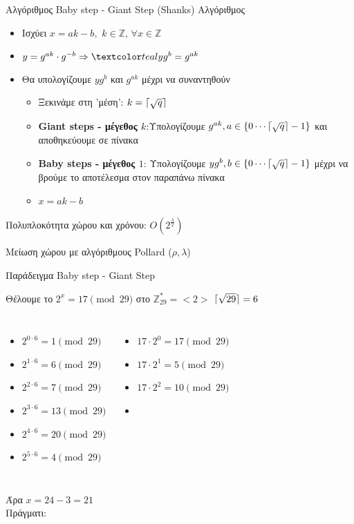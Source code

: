 \documentclass[handout]{beamer}
\DeclarePairedDelimiter{\ceil}{\lceil}{\rceil}
\begin{document}
\begin{frame}{Αλγόριθμος Baby step - Giant Step (Shanks)}
Αλγόριθμος 
\begin{itemize}
\item Ισχύει $x = ak-b, \, \,  k \in \mathbb{Z}, \, \forall x \in \mathbb{Z}$ 
\pause
\item $y=g^{ak} \cdot g^{-b} \Rightarrow \green{{y}{g^b}=g^{ak}}$
\pause
\item Θα υπολογίζουμε $yg^b$ και $g^{ak}$ μέχρι να συναντηθούν
\pause
\begin{itemize}
\item Ξεκινάμε στη 'μέση': $k = \ceil{\sqrt{q}}$\pause
\item \textbf{Giant steps - μέγεθος $k$}:Υπολογίζουμε ${g^{ak}}, a \in \{0 \cdots \ceil{\sqrt{q}}-1 \}$ και αποθηκεύουμε σε πίνακα \pause
\item \textbf{Baby steps - μέγεθος $1$}: Υπολογίζουμε $yg^b, b \in \{0 \cdots \ceil{\sqrt{q}}-1 \}$  μέχρι να βρούμε το αποτέλεσμα στον παραπάνω πίνακα \pause
\item $x = ak-b$
\end{itemize}
\end{itemize}
Πολυπλοκότητα χώρου και χρόνου: $O(2^\frac{\lambda}{2})$

Μείωση χώρου με αλγόριθμους Pollard ($\rho, \lambda$)
\end{frame}

\begin{frame}{Παράδειγμα Baby step - Giant Step}
\begin{block}{Θέλουμε το $2^x = 17 \pmod{29}$ στο $\mathbb{Z}_{29}^*=<2>$}
$\ceil{\sqrt{29}} = 6$
\pause
\begin{columns}
\begin{itemize}
\item $2^{0 \cdot 6} = 1  \pmod{29}$
\pause
\item $2^{1 \cdot 6} = 6  \pmod{29}$
\pause
\item $2^{2 \cdot 6} = 7  \pmod{29}$
\pause
\item $2^{3 \cdot 6} = 13  \pmod{29}$
\pause
\item $2^{4 \cdot 6} = 20  \pmod{29}$
\pause
\item $2^{5 \cdot 6} = 4  \pmod{29}$
\end{itemize}
\pause
{}
\begin{itemize}
\item $17 \cdot 2^{0} = 17  \pmod{29}$
\pause
\item $17 \cdot 2^{1} = 5  \pmod{29}$
\pause
\item $17 \cdot 2^{2} = 10  \pmod{29}$
\pause
\item {}
\end{itemize}
\end{columns}
\pause
\begin{center}
Άρα $x = 24-3 = 21$\\
Πράγματι: 
\end{center}
\end{block}

\end{frame}
\end{document}
